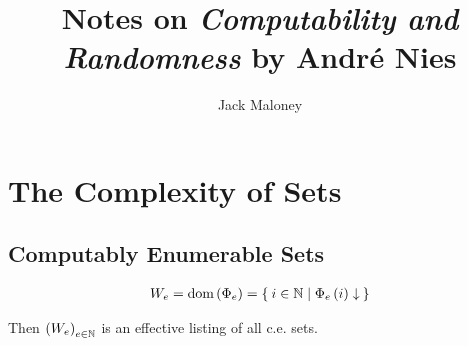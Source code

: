 \documentclass[11pt]{article}
\title{Notes on \textit{Computability and Randomness} by André Nies}
\author{Jack Maloney}
\date{}
\renewcommand{\P}[1]{{\Phi}_{#1}}
\newcommand{\Pe}{\P{e}}
\newcommand{\PP}[2]{ \P{#1} \Parens{#2} }
\newcommand{\PeP}[1]{ \PP{e}{#1} }
\newcommand{\Cvgs}[1]{{#1 \converges}}
\begin{document}
\maketitle

\section{The Complexity of Sets}

\subsection{Computably Enumerable Sets}

\begin{align}
	W_e 
	= \text{dom} \Parens{\Pe} 
	= \Set{ i \in \N | \Cvgs{\PeP{i}} }
\end{align}

Then \( \left( W_e \right)_{e \in \mathbb{N}} \) is an effective listing of all c.e. sets.
\end{document}
